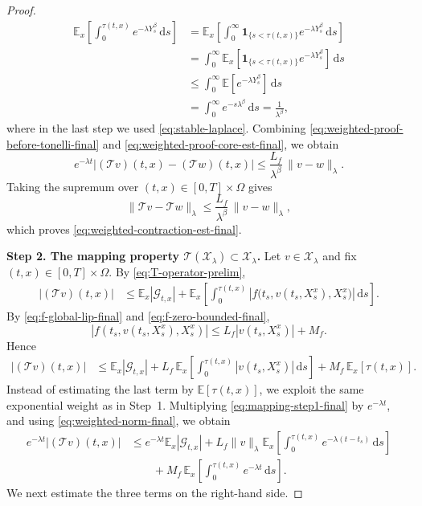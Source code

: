 \documentclass[10pt,a4paper]{amsart}
\begin{document}
\begin{proof}
\begin{align}
\mathbb{E}_x\!\left[
\int_0^{\tau(t,x)} e^{-\lambda Y_s^\beta}\,\mathrm{d}s
\right]
&=
\mathbb{E}_x\!\left[
\int_0^\infty \mathbf{1}_{\{s<\tau(t,x)\}} e^{-\lambda Y_s^\beta}\,\mathrm{d}s
\right]
\nonumber\\
&=
\int_0^\infty
\mathbb{E}_x\!\left[
\mathbf{1}_{\{s<\tau(t,x)\}} e^{-\lambda Y_s^\beta}
\right]
\,\mathrm{d}s
\nonumber\\
&\le
\int_0^\infty
\mathbb{E}\!\left[e^{-\lambda Y_s^\beta}\right]
\,\mathrm{d}s
\nonumber\\
&=
\int_0^\infty e^{-s\lambda^\beta}\,\mathrm{d}s
=
\frac{1}{\lambda^\beta},
\label{eq:weighted-proof-core-est-final}
\end{align}
where in the last step we used \eqref{eq:stable-laplace}. Combining \eqref{eq:weighted-proof-before-tonelli-final} and \eqref{eq:weighted-proof-core-est-final}, we obtain
\[
e^{-\lambda t}|(\mathcal{T}v)(t,x)-(\mathcal{T}w)(t,x)|
\le
\frac{L_f}{\lambda^\beta}\,\|v-w\|_\lambda.
\]
Taking the supremum over $(t,x)\in[0,T]\times\Omega$ gives
\[
\|\mathcal{T}v-\mathcal{T}w\|_\lambda
\le
\frac{L_f}{\lambda^\beta}\,\|v-w\|_\lambda,
\]
which proves \eqref{eq:weighted-contraction-est-final}.

\medskip
\noindent
\textbf{Step 2. The mapping property $\mathcal{T}(\mathcal{X}_\lambda)\subset\mathcal{X}_\lambda$.}
Let $v\in\mathcal{X}_\lambda$ and fix $(t,x)\in[0,T]\times\Omega$. By \eqref{eq:T-operator-prelim},
\begin{align}
|(\mathcal{T}v)(t,x)|
&\le
\mathbb{E}_x|\mathcal{G}_{t,x}|
+
\mathbb{E}_x\!\left[
\int_0^{\tau(t,x)}
\left|f\!\bigl(t_s,v(t_s,X_s^x),X_s^x\bigr)\right|
\,\mathrm{d}s
\right].
\label{eq:mapping-step1-final}
\end{align}
By \eqref{eq:f-global-lip-final} and \eqref{eq:f-zero-bounded-final},
\[
|f(t_s,v(t_s,X_s^x),X_s^x)|
\le
L_f|v(t_s,X_s^x)|+M_f.
\]
Hence
\begin{align}
|(\mathcal{T}v)(t,x)|
&\le
\mathbb{E}_x|\mathcal{G}_{t,x}|
+
L_f\,
\mathbb{E}_x\!\left[
\int_0^{\tau(t,x)}
|v(t_s,X_s^x)|\,\mathrm{d}s
\right]
+
M_f\,\mathbb{E}_x[\tau(t,x)].
\label{eq:mapping-step2-rough-final}
\end{align}
Instead of estimating the last term by $\mathbb{E}[\tau(t,x)]$, we exploit the same exponential weight as in Step~1. Multiplying \eqref{eq:mapping-step1-final} by $e^{-\lambda t}$, and using \eqref{eq:weighted-norm-final}, we obtain
\begin{align}
e^{-\lambda t}|(\mathcal{T}v)(t,x)|
&\le
e^{-\lambda t}\mathbb{E}_x|\mathcal{G}_{t,x}|
+
L_f\|v\|_\lambda
\mathbb{E}_x\!\left[
\int_0^{\tau(t,x)}
e^{-\lambda(t-t_s)}\,\mathrm{d}s
\right]
\nonumber\\
&\qquad
+
M_f\,
\mathbb{E}_x\!\left[
\int_0^{\tau(t,x)} e^{-\lambda t}\,\mathrm{d}s
\right].
\label{eq:mapping-step3-final}
\end{align}
We next estimate the three terms on the right-hand side.


\end{proof}
\end{document}
